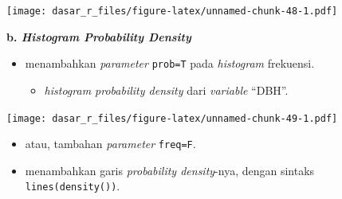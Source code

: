 \documentclass[
  12pt,
  a4paper,
]{scrbook}
\newenvironment{Shaded}{\begin{snugshade}}{\end{snugshade}}
\newcommand{\DataTypeTok}[1]{\textcolor[rgb]{0.13,0.29,0.53}{#1}}
\newcommand{\KeywordTok}[1]{\textcolor[rgb]{0.13,0.29,0.53}{\textbf{#1}}}
\newcommand{\NormalTok}[1]{#1}
\newcommand{\OperatorTok}[1]{\textcolor[rgb]{0.81,0.36,0.00}{\textbf{#1}}}
\newcommand{\StringTok}[1]{\textcolor[rgb]{0.31,0.60,0.02}{#1}}
\providecommand{\tightlist}{%
  \setlength{\itemsep}{0pt}\setlength{\parskip}{0pt}}
\begin{document}
\texttt{[image: dasar\_r\_files/figure-latex/unnamed-chunk-48-1.pdf]}

\textbf{b. \emph{Histogram Probability Density}}

\begin{itemize}
\tightlist
\item
  menambahkan \emph{parameter} \texttt{prob=T} pada \emph{histogram}
  frekuensi.

  \begin{itemize}
  \tightlist
  \item
    \emph{histogram probability density} dari \emph{variable} ``DBH''.
  \end{itemize}
\end{itemize}

\begin{Shaded}
\end{Shaded}

\texttt{[image: dasar\_r\_files/figure-latex/unnamed-chunk-49-1.pdf]}

\begin{itemize}
\tightlist
\item
  atau, tambahan \emph{parameter} \texttt{freq=F}.
\end{itemize}

\begin{Shaded}
\end{Shaded}

\begin{itemize}
\tightlist
\item
  menambahkan garis \emph{probability density}-nya, dengan sintaks
  \texttt{lines(density())}.
\end{itemize}

\begin{Shaded}
\end{Shaded}
\end{document}
